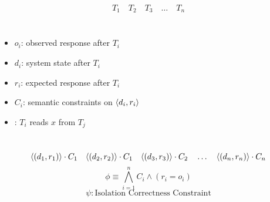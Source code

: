 
\begin{frame}{}
	\begin{center}

		\pause
		\vspace{0.50cm}

		\pause
		\vspace{0.20cm}
	\end{center}
\end{frame}

\begin{frame}{}
	\begin{center}

		\pause
		\vspace{0.50cm}
	\end{center}
\end{frame}

\begin{frame}{}
	\[
		T_{1}\quad T_{2}\quad T_{3}\quad \ldots\quad T_{n}
	\]
	\begin{columns}
		  \begin{itemize}
				\item $o_{i}$: observed response after $T_{i}$
				\item $d_{i}$: system state after $T_{i}$
				\item $r_{i}$: expected response after $T_{i}$
				\item $C_{i}$: semantic constraints on $\langle d_{i}, r_{i}\rangle$
				\item {}: $T_{i}$ reads $x$ from $T_{j}$
			\end{itemize}
	\end{columns}
	\pause
	\[
		\langle(d_{1}, r_{1})\rangle \cdot C_{1} \quad
		\langle(d_{2}, r_{2})\rangle \cdot C_{1} \quad
		\langle(d_{3}, r_{3})\rangle \cdot C_{2} \quad\ldots\quad
		\langle(d_{n}, r_{n})\rangle \cdot C_{n}
	\]
	\pause
	\[
		\phi \equiv \bigwedge_{i=1}^{n} C_{i} \land (r_{i} = o_{i})
	\]
	\pause
	\[
		\psi: \text{Isolation Correctness Constraint}
	\]
\end{frame}

